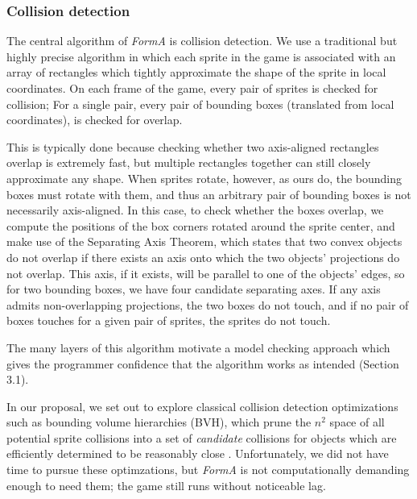 \documentclass{article}
\newcommand{\Name}{\textit{FormA}\xspace}
\begin{document}
        \subsubsection{Collision detection}

            The central algorithm of \Name{} is collision detection. We use a
            traditional but highly precise algorithm in which each sprite in the
            game is associated with an array of rectangles which tightly
            approximate the shape of the sprite in local coordinates. On each
            frame of the game, every pair of sprites is checked for collision;
            For a single pair, every pair of bounding boxes (translated from
            local coordinates), is checked for overlap.

            This is typically done because checking whether two axis-aligned
            rectangles overlap is extremely fast, but multiple rectangles
            together can still closely approximate any shape. When sprites
            rotate, however, as ours do, the bounding boxes must rotate with
            them, and thus an arbitrary pair of bounding boxes is not
            necessarily axis-aligned. In this case, to check whether the boxes
            overlap, we compute the positions of the box corners rotated around
            the sprite center, and make use of the Separating Axis Theorem,
            which states that two convex objects do not overlap if there exists
            an axis onto which the two objects' projections do not overlap. This
            axis, if it exists, will be parallel to one of the objects' edges,
            so for two bounding boxes, we have four candidate separating axes.
            If any axis admits non-overlapping projections, the two boxes do
            not touch, and if no pair of boxes touches for a given pair of
            sprites, the sprites do not touch.

            The many layers of this algorithm motivate a model checking approach
            which gives the programmer confidence that the algorithm works as
            intended (Section 3.1).

            In our proposal, we set out to explore classical collision detection
            optimizations such as bounding volume hierarchies (BVH), which prune
            the $n^2$ space of all potential sprite collisions into a set of
            \textit{candidate} collisions for objects which are efficiently
            determined to be reasonably close \cite{moore1988collision,
            palmer1995collision}. Unfortunately, we did not have time to pursue
            these optimzations, but \Name{} is not computationally demanding
            enough to need them; the game still runs without noticeable lag.
\end{document}
